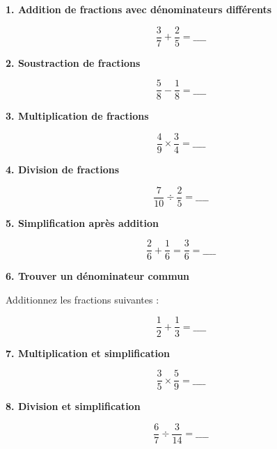 \documentclass{article}
\begin{document}
\begin{tcolorbox}[colback=purple!10!white, colframe=yellow!75!black, title=\textcolor{white}{Exercices d'Application}, sharp corners=south, boxrule=0.8mm]
    \textbf{1. Addition de fractions avec dénominateurs différents}
    
    \[
    \frac{3}{7} + \frac{2}{5} = \_\_\_\_
    \]
    
    \vspace{10pt}
    
    \textbf{2. Soustraction de fractions}
    
    \[
    \frac{5}{8} - \frac{1}{8} = \_\_\_\_
    \]
    
    \vspace{10pt}
    
    \textbf{3. Multiplication de fractions}
    
    \[
    \frac{4}{9} \times \frac{3}{4} = \_\_\_\_
    \]
    
    \vspace{10pt}
    
    \textbf{4. Division de fractions}
    
    \[
    \frac{7}{10} \div \frac{2}{5} = \_\_\_\_
    \]
    
    \vspace{10pt}
    
    \textbf{5. Simplification après addition}
    
    \[
    \frac{2}{6} + \frac{1}{6} = \frac{3}{6} = \_\_\_\_
    \]
    
    \vspace{10pt}
    
    \textbf{6. Trouver un dénominateur commun}
    
    Additionnez les fractions suivantes :
    
    \[
    \frac{1}{2} + \frac{1}{3} = \_\_\_\_
    \]
    
    \vspace{10pt}
    
    \textbf{7. Multiplication et simplification}
    
    \[
    \frac{3}{5} \times \frac{5}{9} = \_\_\_\_
    \]
    
    \vspace{10pt}
    
    \textbf{8. Division et simplification}
    
    \[
    \frac{6}{7} \div \frac{3}{14} = \_\_\_\_
    \]
    
    \vspace{10pt}
    

\end{tcolorbox}
\end{document}
